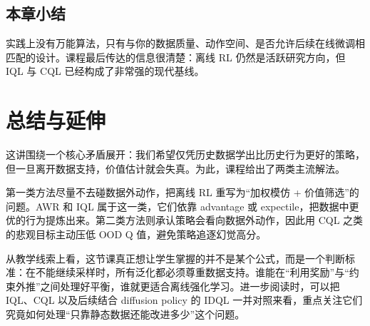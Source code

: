 \documentclass[a4paper]{article}
\begin{document}
\subsection{本章小结}
实践上没有万能算法，只有与你的数据质量、动作空间、是否允许后续在线微调相匹配的设计。课程最后传达的信息很清楚：离线 RL 仍然是活跃研究方向，但 IQL 与 CQL 已经构成了非常强的现代基线。

\section{总结与延伸}
这讲围绕一个核心矛盾展开：我们希望仅凭历史数据学出比历史行为更好的策略，但一旦离开数据支持，价值估计就会失真。为此，课程给出了两类主流解法。

第一类方法尽量不去碰数据外动作，把离线 RL 重写为“加权模仿 + 价值筛选”的问题。AWR 和 IQL 属于这一类，它们依靠 advantage 或 expectile，把数据中更优的行为提炼出来。第二类方法则承认策略会看向数据外动作，因此用 CQL 之类的悲观目标主动压低 OOD Q 值，避免策略追逐幻觉高分。

从教学线索上看，这节课真正想让学生掌握的并不是某个公式，而是一个判断标准：在不能继续采样时，所有泛化都必须尊重数据支持。谁能在“利用奖励”与“约束外推”之间处理好平衡，谁就更适合离线强化学习。进一步阅读时，可以把 IQL、CQL 以及后续结合 diffusion policy 的 IDQL 一并对照来看，重点关注它们究竟如何处理“只靠静态数据还能改进多少”这个问题。
\end{document}
